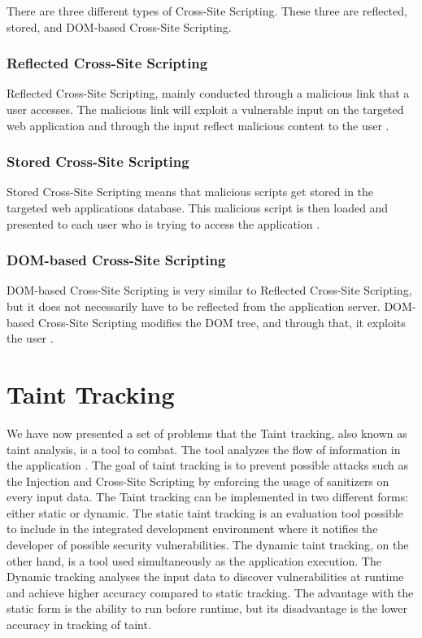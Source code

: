 There are three different types of Cross-Site Scripting. These three are reflected, stored, and DOM-based Cross-Site Scripting.



\subsubsection{Reflected Cross-Site Scripting}
Reflected Cross-Site Scripting, mainly conducted through a malicious link that a user accesses. The malicious link will exploit a vulnerable input on the targeted web application and through the input reflect malicious content to the user \parencite{Secure_Web}.



\subsubsection{Stored Cross-Site Scripting}
Stored Cross-Site Scripting means that malicious scripts get stored in the targeted web applications database. This malicious script is then loaded and presented to each user who is trying to access the application \parencite{Secure_Web}.



\subsubsection{DOM-based Cross-Site Scripting}
DOM-based Cross-Site Scripting is very similar to Reflected Cross-Site Scripting, but it does not necessarily have to be reflected from the application server. DOM-based Cross-Site Scripting modifies the DOM tree, and through that, it exploits the user \parencite{Secure_Web}.



\section{Taint Tracking}
\label{DynamicTaintTracking}
We have now presented a set of problems that the Taint tracking, also known as taint analysis, is a tool to combat. The tool analyzes the flow of information in the application \parencite{Pan2015}. The goal of taint tracking is to prevent possible attacks such as the Injection and Cross-Site Scripting by enforcing the usage of sanitizers on every input data. The Taint tracking can be implemented in two different forms: either static or dynamic. The static taint tracking is an evaluation tool possible to include in the integrated development environment where it notifies the developer of possible security vulnerabilities. The dynamic taint tracking, on the other hand, is a tool used simultaneously as the application execution. The Dynamic tracking analyses the input data to discover vulnerabilities at runtime and achieve higher accuracy compared to static tracking. The advantage with the static form is the ability to run before runtime, but its disadvantage is the lower accuracy in tracking of taint.

